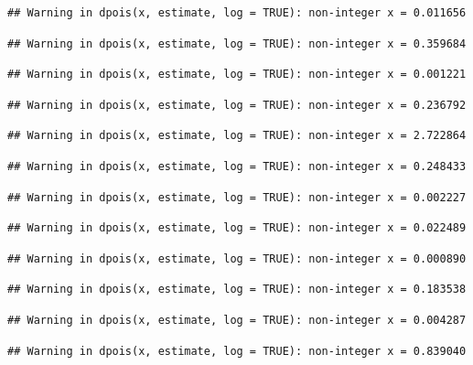 \documentclass[]{article}
\begin{document}
\begin{verbatim}
## Warning in dpois(x, estimate, log = TRUE): non-integer x = 0.011656
\end{verbatim}

\begin{verbatim}
## Warning in dpois(x, estimate, log = TRUE): non-integer x = 0.359684
\end{verbatim}

\begin{verbatim}
## Warning in dpois(x, estimate, log = TRUE): non-integer x = 0.001221
\end{verbatim}

\begin{verbatim}
## Warning in dpois(x, estimate, log = TRUE): non-integer x = 0.236792
\end{verbatim}

\begin{verbatim}
## Warning in dpois(x, estimate, log = TRUE): non-integer x = 2.722864
\end{verbatim}

\begin{verbatim}
## Warning in dpois(x, estimate, log = TRUE): non-integer x = 0.248433
\end{verbatim}

\begin{verbatim}
## Warning in dpois(x, estimate, log = TRUE): non-integer x = 0.002227
\end{verbatim}

\begin{verbatim}
## Warning in dpois(x, estimate, log = TRUE): non-integer x = 0.022489
\end{verbatim}

\begin{verbatim}
## Warning in dpois(x, estimate, log = TRUE): non-integer x = 0.000890
\end{verbatim}

\begin{verbatim}
## Warning in dpois(x, estimate, log = TRUE): non-integer x = 0.183538
\end{verbatim}

\begin{verbatim}
## Warning in dpois(x, estimate, log = TRUE): non-integer x = 0.004287
\end{verbatim}

\begin{verbatim}
## Warning in dpois(x, estimate, log = TRUE): non-integer x = 0.839040
\end{verbatim}
\end{document}
